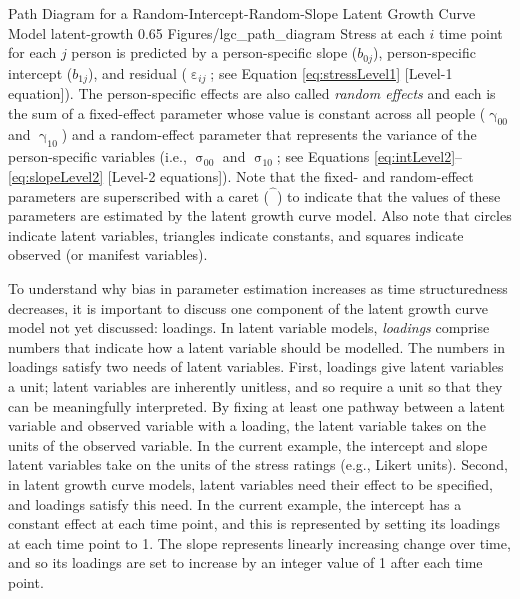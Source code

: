 \documentclass[
12pt, %
twoside,
english]{guelphthesis}
\begin{document}
\begin{apaFigure}
[portrait]
[samepage]
[-0.2cm]
{Path Diagram for a Random-Intercept-Random-Slope Latent Growth Curve Model}
{latent-growth}
{0.65}
{Figures/lgc_path_diagram}
{Stress at each $i$ time point for each $j$ person is predicted by a person-specific slope ($b_{0j}$), person-specific intercept ($b_{1j}$), and residual ($\upepsilon_{ij}$; see Equation \ref{eq:stressLevel1} [Level-1 equation]). The person-specific effects are also called \textit{random effects} and each is the sum of a fixed-effect parameter whose value is constant across all people ($\upgamma_{00}$ and $\upgamma_{10}$) and a random-effect parameter that represents the variance of the person-specific variables (i.e., $\upsigma_{00}$ and $\upsigma_{10}$; see Equations \ref{eq:intLevel2}--\ref{eq:slopeLevel2} [Level-2 equations]). Note that the fixed- and random-effect parameters are superscribed with a caret ($\hat{\phantom{\beta}}$) to indicate that the values of these parameters are estimated by the latent growth curve model. Also note that circles indicate latent variables, triangles indicate constants, and squares indicate observed (or manifest variables).}
\end{apaFigure}
To understand why bias in parameter estimation increases as time structuredness decreases, it is important to discuss one component of the latent growth curve model not yet discussed: loadings. In latent variable models, \emph{loadings} comprise numbers that indicate how a latent variable should be modelled. The numbers in loadings satisfy two needs of latent variables. First, loadings give latent variables a unit; latent variables are inherently unitless, and so require a unit so that they can be meaningfully interpreted. By fixing at least one pathway between a latent variable and observed variable with a loading, the latent variable takes on the units of the observed variable. In the current example, the intercept and slope latent variables take on the units of the stress ratings (e.g., Likert units). Second, in latent growth curve models, latent variables need their effect to be specified, and loadings satisfy this need. In the current example, the intercept has a constant effect at each time point, and this is represented by setting its loadings at each time point to 1. The slope represents linearly increasing change over time, and so its loadings are set to increase by an integer value of 1 after each time point.
\end{document}
